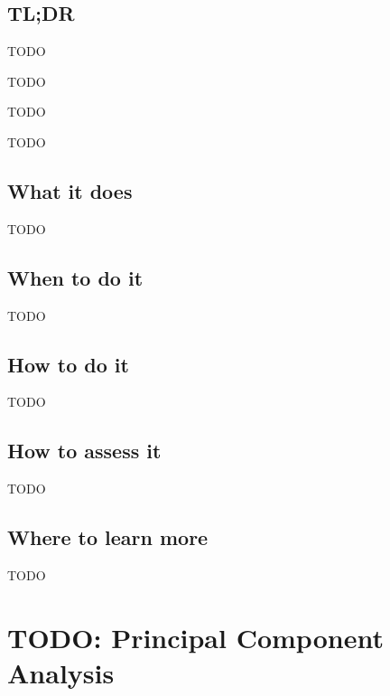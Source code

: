 \documentclass[
]{book}
\providecommand{\tightlist}{%
  \setlength{\itemsep}{0pt}\setlength{\parskip}{0pt}}
\begin{document}
\hypertarget{tldr-19}{%
\section{TL;DR}\label{tldr-19}}

\begin{description}
\tightlist
\item[What it does]
TODO
\item[When to do it]
TODO
\item[How to do it]
TODO
\item[How to assess it]
TODO
\end{description}

\hypertarget{what-it-does-19}{%
\section{What it does}\label{what-it-does-19}}

TODO

\hypertarget{when-to-do-it-19}{%
\section{When to do it}\label{when-to-do-it-19}}

TODO

\hypertarget{how-to-do-it-19}{%
\section{How to do it}\label{how-to-do-it-19}}

TODO

\hypertarget{how-to-assess-it-19}{%
\section{How to assess it}\label{how-to-assess-it-19}}

TODO

\hypertarget{where-to-learn-more-19}{%
\section{Where to learn more}\label{where-to-learn-more-19}}

TODO

\hypertarget{principal-component-analysis}{%
\chapter{TODO: Principal Component Analysis}\label{principal-component-analysis}}
\end{document}
